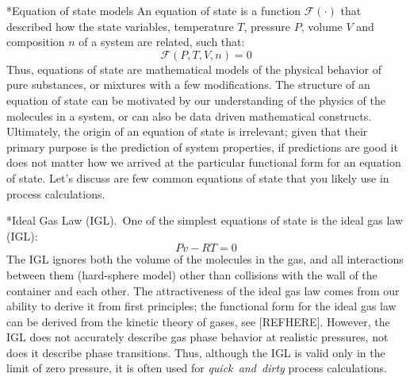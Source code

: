 \documentclass[11pt]{article}
\makeatletter
\theoremstyle{definition}
\renewcommand\subsection{\@startsection
	{subsection}{2}{0mm}
	{-0.05in}
	{0.5\baselineskip}
	{\normalfont\normalsize\bfseries}}
\renewcommand\subsubsection{\@startsection
	{subsubsection}{2}{0mm}
	{-0.05in}
	{-0.5\baselineskip}
	{\normalfont\normalsize\bfseries}}
\makeatother
\begin{document}
\subsection*{Equation of state models}
An equation of state is a function $\mathcal{F}(\cdot)$ that described how the state variables, temperature $T$, pressure $P$, volume $V$ and composition $n$
of a system are related, such that:
\begin{equation}
\mathcal{F}\left(P,T,V,n\right) = 0
\end{equation}
Thus, equations of state are mathematical models of the physical behavior of pure substances, or mixtures with a few modifications.
The structure of an equation of state can be motivated by our understanding of the physics of the molecules in a system, or can also be data driven mathematical constructs.
Ultimately, the origin of an equation of state is irrelevant; given that their primary purpose is the prediction of system properties, if predictions are good it does not
matter how we arrived at the particular functional form for an equation of state. Let's discuss are few common equations of state that you likely use in process
calculations.

\subsubsection*{Ideal Gas Law (IGL).}~One of the simplest equations of state is the ideal gas law (IGL):
\begin{equation}
  Pv-RT = 0
\end{equation}
The IGL ignores both the volume of the molecules in the gas, and all interactions between them (hard-sphere model)
other than collisions with the wall of the container and each other.
The attractiveness of the ideal gas law comes from our ability to derive it from first principles;
the functional form for the ideal gas law can be derived from the kinetic theory of gases, see [REFHERE].
However, the IGL does not accurately describe gas phase behavior at realistic pressures, not does it describe phase transitions.
Thus, although the IGL is valid only in the limit of zero pressure, it is often used for \textit{quick~and~dirty} process calculations.

\end{document}
